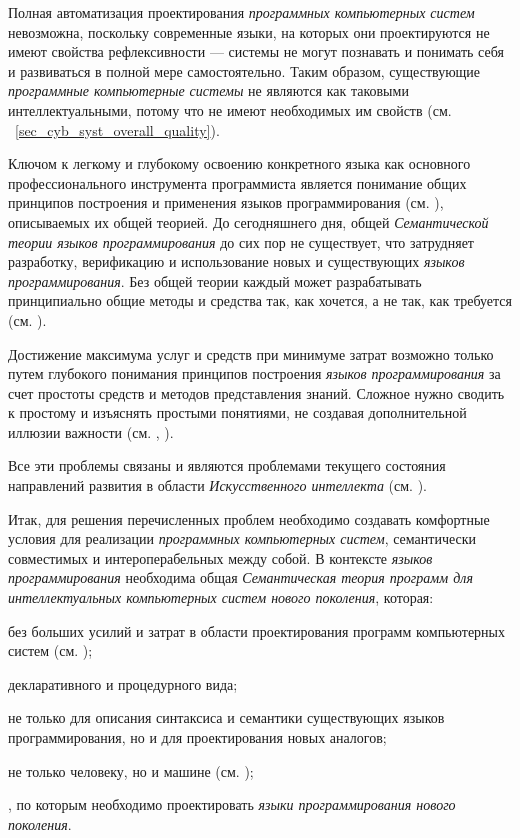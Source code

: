 \begin{textitemize}
    \item Полная автоматизация проектирования \textit{программных компьютерных систем} невозможна, поскольку современные языки, на которых они проектируются не имеют свойства рефлексивности --- системы не могут познавать и понимать себя и развиваться в полной мере самостоятельно. Таким образом, существующие \textit{программные компьютерные системы} не являются как таковыми интеллектуальными, потому что не имеют необходимых им свойств (см. ~\ref{sec_cyb_syst_overall_quality}).
    \item Ключом к легкому и глубокому освоению конкретного языка как основного профессионального инструмента программиста является понимание общих принципов построения и применения языков программирования (см. ), описываемых их общей теорией. До сегодняшнего дня, общей \textit{Семантической теории языков программирования} до сих пор не существует, что затрудняет разработку, верификацию и использование новых и существующих \textit{языков программирования}. Без общей теории каждый может разрабатывать принципиально общие методы и средства так, как хочется, а не так, как требуется (см. ).
    \item Достижение максимума услуг и средств при минимуме затрат возможно только путем глубокого понимания принципов построения \textit{языков программирования} за счет простоты средств и методов представления знаний. Сложное нужно сводить к простому и изъяснять простыми понятиями, не создавая дополнительной иллюзии важности (см. , ).
\end{textitemize}

Все эти проблемы связаны и являются проблемами текущего состояния направлений развития в области \textit{Искусственного интеллекта} (см. ).

Итак, для решения перечисленных проблем необходимо создавать комфортные условия для реализации \textit{программных компьютерных систем}, семантически совместимых и интероперабельных между собой. В контексте \textit{языков программирования} необходима общая \textit{Семантическая теория программ для интеллектуальных компьютерных систем нового поколения}, которая:
\begin{textitemize}
    \item {} без больших усилий и затрат  в области проектирования программ компьютерных систем (см. );
    \item {} декларативного и процедурного вида;
    \item {} не только для описания синтаксиса и семантики существующих языков программирования, но и для проектирования новых аналогов;
    \item {} не только человеку, но и машине (см. );
    \item {}, по которым необходимо проектировать \textit{языки программирования нового поколения}.
\end{textitemize}

